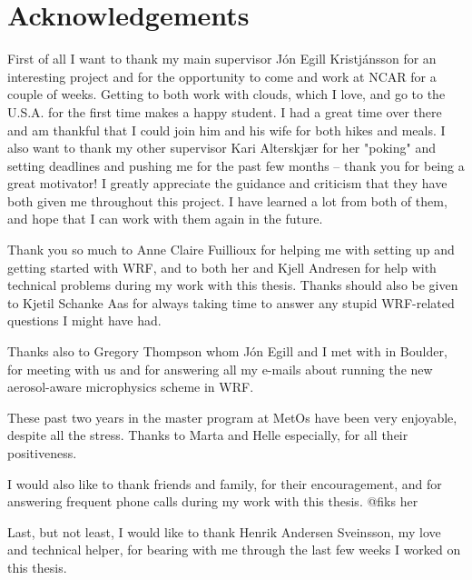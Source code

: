 \chapter*{Acknowledgements}

First of all I want to thank my main supervisor Jón Egill Kristjánsson for an interesting project and for the opportunity to come and work at NCAR for a couple of weeks. Getting to both work with clouds, which I love, and go to the U.S.A. for the first time makes a happy student. I had a great time over there and am thankful that I could join him and his wife for both hikes and meals. I also want to thank my other supervisor Kari Alterskjær for her "poking" and setting deadlines and pushing me for the past few months -- thank you for being a great motivator! I greatly appreciate the guidance and criticism that they have both given me throughout this project. I have learned a lot from both of them, and hope that I can work with them again in the future.

Thank you so much to Anne Claire Fuillioux for helping me with setting up and getting started with WRF, and to both her and Kjell Andresen for help with technical problems during my work with this thesis. Thanks should also be given to Kjetil Schanke Aas for always taking time to answer any stupid WRF-related questions I might have had.

Thanks also to Gregory Thompson whom Jón Egill and I met with in Boulder, for meeting with us and for answering all my e-mails about running the new aerosol-aware microphysics scheme in WRF.

These past two years in the master program at MetOs have been very enjoyable, despite all the stress. Thanks to Marta and Helle especially, for all their positiveness.

I would also like to thank friends and family, for their encouragement, and for answering frequent phone calls during my work with this thesis. @fiks her

Last, but not least, I would like to thank Henrik Andersen Sveinsson, my love and technical helper, for bearing with me through the last few weeks I worked on this thesis.
